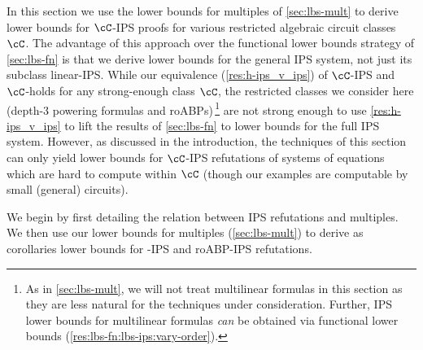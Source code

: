 \documentclass[11pt]{article}
\numberwithin{equation}{section}
\theoremstyle{definition}
\theoremstyle{plain}
\begin{document}
In this section we use the lower bounds for multiples of \autoref{sec:lbs-mult} to derive lower bounds for $\cC$-IPS proofs for various restricted algebraic circuit classes $\cC$.  The advantage of this approach over the functional lower bounds strategy of \autoref{sec:lbs-fn} is that we derive lower bounds for the general IPS system, not just its subclass linear-IPS\@.  While our equivalence (\autoref{res:h-ips_v_ips}) of $\cC$-IPS and $\cC$-\lIPS holds for any strong-enough class $\cC$, the restricted classes we consider here (depth-3 powering formulas and roABPs)\,\footnote{As in \autoref{sec:lbs-mult}, we will not treat multilinear formulas in this section as they are less natural for the techniques under consideration.  Further,  IPS lower bounds for multilinear formulas \emph{can} be obtained via functional lower bounds (\autoref{res:lbs-fn:lbs-ips:vary-order}).} are not strong enough to use \autoref{res:h-ips_v_ips} to lift the results of \autoref{sec:lbs-fn} to lower bounds for the full IPS system.  However, as discussed in the introduction, the techniques of this section can only yield lower bounds for $\cC$-IPS refutations of systems of equations which are hard to compute within $\cC$ (though our examples are computable by small (general) circuits).

We begin by first detailing the relation between IPS refutations and multiples.  We then use our lower bounds for multiples (\autoref{sec:lbs-mult}) to derive as corollaries lower bounds for \sumpowsum-IPS and roABP-IPS refutations.
\end{document}
